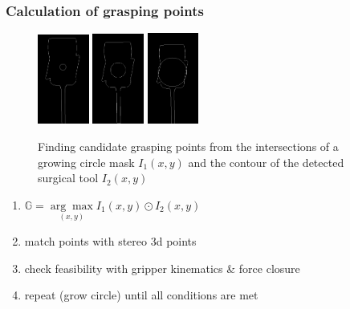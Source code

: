 \begin{frame}
\frametitle{Calculation of grasping points}
\begin{center}
\begin{figure}[!htb]
\centering
\includegraphics[width=0.15\textwidth]{../images/grasp_points_1.png}
\includegraphics[width=0.15\textwidth]{../images/grasp_points_2.png}
\includegraphics[width=0.15\textwidth]{../images/grasp_points_3.png}\\
\caption{Finding candidate grasping points from the intersections of a growing circle mask $I_1(x,y)$ and the contour of the detected surgical tool $I_2(x,y)$}
\end{figure}

\begin{enumerate}
\item $\mathbb{G} = \underset{(x,y)}{\arg\max} I_1(x,y) \odot I_2(x,y)$
\item match points with stereo 3d points
\item check feasibility with gripper kinematics \& force closure
\item repeat (grow circle) until all conditions are met
\end{enumerate}

\end{center}
\end{frame}
